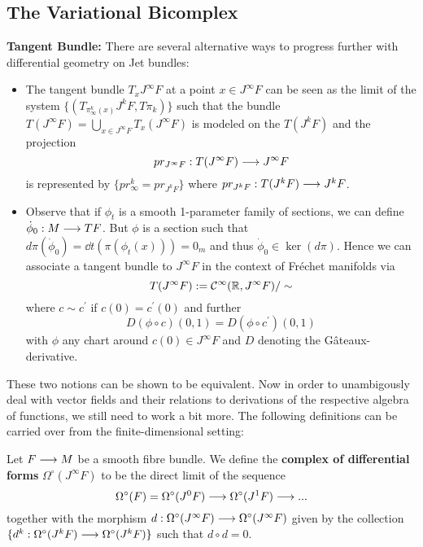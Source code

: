\subsection{The Variational Bicomplex}

\textbf{Tangent Bundle:} There are several alternative ways to progress further with differential geometry on Jet bundles:
\begin{itemize}
  \item  The tangent bundle $T_xJ^\infty F$ at a point $x\in J^\infty F$ can be seen as the limit of the system $\{ (T_{\pi^k_\infty(x)}J^kF, T\pi_k) \}$ such that the bundle $T(J^\infty F) = \bigcup_{x\in J^\infty F} T_x(J^\infty F)$ is modeled on the $T(J^k F)$ and the projection
  $$ pr_{J^\infty F}: T(J^\infty F) \longrightarrow J^\infty F $$
  is represented by $\{ pr_\infty^k = pr_{J^kF} \}$ where $pr_{J^kF}: T(J^kF) \longrightarrow J^kF$.

  \item Observe that if $\phi_t$ is a smooth 1-parameter family of sections, we can define $\dot \phi_0: M \lra TF$. But $\phi$ is a section such that $d\pi(\dot \phi_0) = \dd{}{t}(\pi(\phi_t(x))) = 0_m$ and thus $\dot \phi_0 \in \ker(d\pi)$. Hence we can associate a tangent bundle to $J^\infty F$ in the context of Fréchet manifolds via
  $$ T(J^\infty F) := \mathcal{C}^{\infty}(\mathbb{R}, J^\infty F) / \sim $$
  where $c\sim c^\prime$ if $c(0) = c^\prime (0)$ and further
  $$ D(\phi\circ c) (0,1) = D(\phi \circ c^\prime) (0,1) $$
  with $\phi$ any chart around $c(0) \in J^\infty F$ and $D$ denoting the Gâteaux-derivative.
\end{itemize}

These two notions can be shown to be equivalent. Now in order to unambigously deal with vector fields and their relations to derivations of the respective algebra of functions, we still need to work a bit more. The following definitions can be carried over from the finite-dimensional setting:

\begin{definition}
Let $F\longrightarrow M$ be a smooth fibre bundle. We define the \textbf{complex of differential forms} $\Omega^\circ(J^\infty F)$ to be the direct limit of the sequence
$$ \Omega^\circ(F) = \Omega^\circ(J^0F) \longrightarrow \Omega^\circ(J^1F)\longrightarrow ... $$
together with the morphism $d:\Omega^\circ(J^\infty F)\longrightarrow \Omega^\circ(J^\infty F)$ given by the collection $\{ d^k: \Omega^\circ(J^k F) \longrightarrow \Omega^\circ(J^k F) \}$ such that $d\circ d = 0$.
\end{definition}

